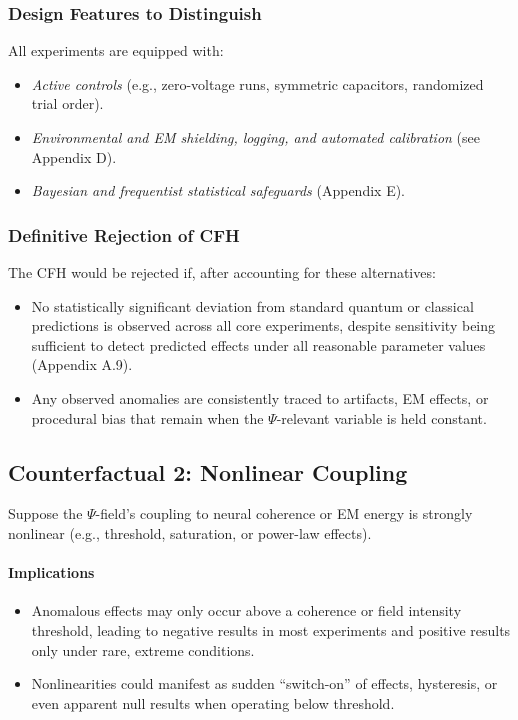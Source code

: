 \documentclass{report}
\begin{document}
\subsubsection*{Design Features to Distinguish}
All experiments are equipped with:
\begin{itemize}
    \item \textit{Active controls} (e.g., zero-voltage runs, symmetric capacitors, randomized trial order).
    \item \textit{Environmental and EM shielding, logging, and automated calibration} (see Appendix D). %
    \item \textit{Bayesian and frequentist statistical safeguards} (Appendix E). %
\end{itemize}

\subsubsection*{Definitive Rejection of CFH}
The CFH would be rejected if, after accounting for these alternatives:
\begin{itemize}
    \item No statistically significant deviation from standard quantum or classical predictions is
    observed across all core experiments, despite sensitivity being sufficient to detect predicted
    effects under all reasonable parameter values (Appendix A.9). %
    \item Any observed anomalies are consistently traced to artifacts, EM effects, or procedural bias
    that remain when the $\Psi$-relevant variable is held constant.
\end{itemize}

\subsection{Counterfactual 2: Nonlinear Coupling}
\label{subsec:counterfactual_nonlinear_coupling_main}

Suppose the $\Psi$-field’s coupling to neural coherence or EM energy is strongly nonlinear (e.g.,
threshold, saturation, or power-law effects).

\paragraph{Implications}
\begin{itemize}
    \item Anomalous effects may only occur above a coherence or field intensity threshold, leading
    to negative results in most experiments and positive results only under rare, extreme
    conditions.
    \item Nonlinearities could manifest as sudden “switch-on” of effects, hysteresis, or even apparent
    null results when operating below threshold.
\end{itemize}
\end{document}
